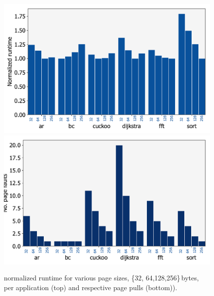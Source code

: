 \begin{figure}
	\centering
	\includegraphics[width=\columnwidth]{figures/page_exec-time}
	\includegraphics[width=\columnwidth]{figures/pagePulls}
	\caption{\sys normalized runtime for various page sizes, \{32, 64,128,256\}\,bytes, per application (top) and respective page pulls (bottom)).}
	\label{fig:page_size}
\end{figure}

